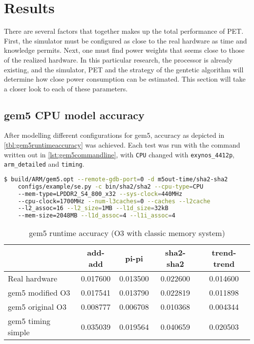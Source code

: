 \section{Results}

There are several factors that together makes up the total performance of PET. First, the simulator must be
configured as close to the real hardware as time and knowledge permits. Next, one must find power weights that
seems close to those of the realized hardware. In this particular research, the processor is already existing,
and the simulator, PET and the strategy of the gentetic algorithm will determine how close power consumption
can be estimated. This section will take a closer look to each of these parameters.

\subsection{gem5 CPU model accuracy}

After modelling different configurations for gem5, accuracy as depicted in \autoref{tbl:gem5runtimeaccuracy}
was achieved. Each test was run with the command written out in \autoref{lst:gem5commandline}, with \texttt{CPU}
changed with  \texttt{exynos\_4412p}, \texttt{arm\_detailed} and \texttt{timing}.

\begin{lstlisting}[language=sh,label={lst:gem5commandline},caption={gem5 Command Line}]
$ build/ARM/gem5.opt --remote-gdb-port=0 -d m5out-time/sha2-sha2
    configs/example/se.py -c bin/sha2/sha2 --cpu-type=CPU
    --mem-type=LPDDR2_S4_800_x32 --sys-clock=440MHz
    --cpu-clock=1700MHz --num-l3caches=0 --caches --l2cache
    --l2_assoc=16 --l2_size=1MB --l1d_size=32kB
    --mem-size=2048MB --l1d_assoc=4 --l1i_assoc=4
\end{lstlisting}


\begin{table}
\centering
\begin{tabular}{|l|c|c|c|c|}
\hline
 & add-add & pi-pi & sha2-sha2 & trend-trend \\
\hline
Real hardware & 0.017600  & 0.013500 & 0.022600 & 0.014600 \\
gem5 modified O3    & 0.017541 & 0.013790 & 0.022819 & 0.011898 \\
gem5 original O3    & 0.008777 & 0.006708 & 0.010368 & 0.004344 \\
gem5 timing simple  & 0.035039 & 0.019564 & 0.040659 & 0.020503 \\
\hline
\end{tabular}
\caption{gem5 runtime accuracy (O3 with classic memory system)}
\label{tbl:gem5runtimeaccuracy}
\end{table}




